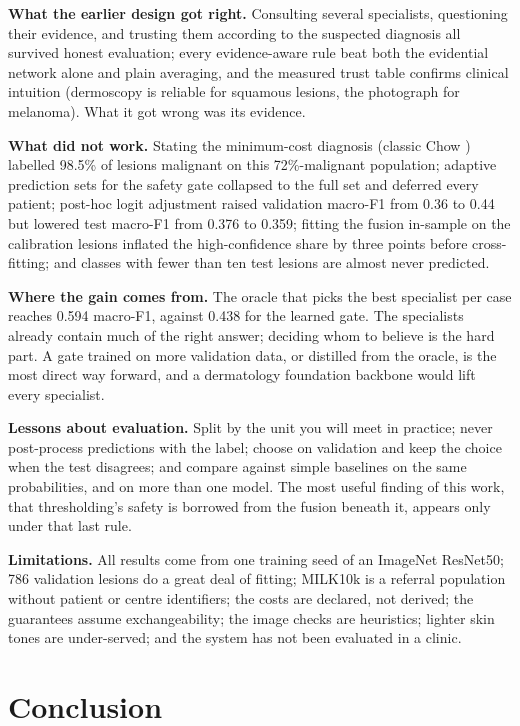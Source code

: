 \documentclass[conference]{IEEEtran}
\begin{document}
\textbf{What the earlier design got right.} Consulting several specialists, questioning
their evidence, and trusting them according to the suspected diagnosis all survived honest
evaluation; every evidence-aware rule beat both the evidential network alone and plain
averaging, and the measured trust table confirms clinical intuition (dermoscopy is reliable
for squamous lesions, the photograph for melanoma). What it got wrong was its evidence.

\textbf{What did not work.} Stating the minimum-cost diagnosis (classic Chow
\cite{chow1970}) labelled 98.5\% of lesions malignant on this 72\%-malignant population;
adaptive prediction sets for the safety gate collapsed to the full set and deferred every
patient; post-hoc logit adjustment raised validation macro-F1 from 0.36 to 0.44 but lowered
test macro-F1 from 0.376 to 0.359; fitting the fusion in-sample on the calibration lesions
inflated the high-confidence share by three points before cross-fitting; and classes with
fewer than ten test lesions are almost never predicted.

\textbf{Where the gain comes from.} The oracle that picks the best specialist per case
reaches 0.594 macro-F1, against 0.438 for the learned gate. The specialists already
contain much of the right answer; deciding whom to believe is the hard part. A gate trained
on more validation data, or distilled from the oracle, is the most direct way forward, and
a dermatology foundation backbone \cite{yan2025panderm} would lift every specialist.

\textbf{Lessons about evaluation.} Split by the unit you will meet in practice; never
post-process predictions with the label; choose on validation and keep the choice when
the test disagrees; and compare against simple baselines on the same probabilities, and on
more than one model. The most useful finding of this work, that thresholding's safety is
borrowed from the fusion beneath it, appears only under that last rule.

\textbf{Limitations.} All results come from one training seed of an ImageNet ResNet50;
786 validation lesions do a great deal of fitting; MILK10k is a referral population
without patient or centre identifiers; the costs are declared, not derived; the guarantees
assume exchangeability; the image checks are heuristics; lighter skin tones are under-served;
and the system has not been evaluated in a clinic.

\section{Conclusion}
\end{document}
